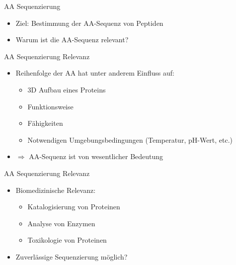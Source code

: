 \documentclass{beamer}
\newcommand{\dashAndSpace}{\textendash \space}
\newcommand{\highlightColor}{nDarkBlue!55!}
\begin{document}
    \begin{frame}{AA Sequenzierung}
        \begin{itemize}
            \item<1-> Ziel: Bestimmung der \textcolor{\highlightColor}{AA-Sequenz} von Peptiden
            \vspace*{0.5cm}
            \item<2-> Warum ist die AA-Sequenz relevant?
        \end{itemize}
    \end{frame}


    \begin{frame}{AA Sequenzierung \dashAndSpace Relevanz}
        \begin{itemize}
            \item<1-> Reihenfolge der AA hat unter anderem Einfluss auf:
            \begin{itemize}
                \item<2-> 3D Aufbau eines Proteins
                \item<2-> Funktionsweise
                \item<2-> Fähigkeiten
                \item<2-> Notwendigen Umgebungsbedingungen (Temperatur, pH-Wert, etc.)
                \end{itemize}
            \item<3-> $\Rightarrow$ AA-Sequenz ist von \textcolor{\highlightColor}{wesentlicher Bedeutung}
        \end{itemize}
    \end{frame}


    \begin{frame}{AA Sequenzierung \dashAndSpace Relevanz}
        \begin{itemize}
            \item<1-> Biomedizinische Relevanz:
            \begin{itemize}
                \item<2-> Katalogisierung von Proteinen
                \item<2-> Analyse von Enzymen
                \item<2-> Toxikologie von Proteinen
            \end{itemize}
            \vspace*{0.5cm}
            \item<3-> Zuverlässige Sequenzierung möglich?
        \end{itemize}
    \end{frame}
\end{document}

